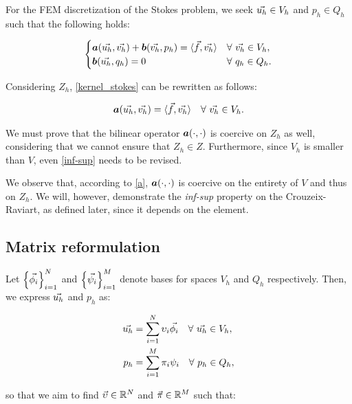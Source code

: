 For the FEM discretization of the Stokes problem, we seek $\vec{u_h} \in V_h$ and $p_h \in Q_h$ such that the following holds:

\begin{gather} \label{fem_stokes}
    \begin{cases}
        \bm{a}(\vec{u_h}, \vec{v_h}) + \bm{b}(\vec{v_h}, p_h) = \langle \vec{f}, \vec{v_h} \rangle & \forall ~ \vec{v_h} \in V_h, \\
        \bm{b}(\vec{u_h}, q_h) = 0 & \forall ~ q_h \in Q_h.
    \end{cases}
\end{gather}

Considering $Z_h$, \eqref{kernel_stokes} can be rewritten as follows:

\begin{gather} \label{fem_kernel}
    \bm{a}(\vec{u_h}, \vec{v_h}) = \langle \vec{f}, \vec{v_h} \rangle \quad \forall ~ \vec{v_h} \in V_h.
\end{gather}

We must prove that the bilinear operator $\bm{a}(\cdot, \cdot)$ is coercive on $Z_h$ as well, considering that we cannot ensure that $Z_h \in Z$. Furthermore, since $V_h$ is smaller than $V$, even \eqref{inf-sup} needs to be revised. 

We observe that, according to \eqref{a}, $\bm{a}(\cdot, \cdot)$ is coercive on the entirety of $V$ and thus on $Z_h$. We will, however, demonstrate the \textit{inf-sup} property on the Crouzeix-Raviart, as defined later, since it depends on the element.

\subsection{Matrix reformulation}

Let $\left\{ \vec{\phi_i} \right\}_{i = 1}^N$ and $\left\{ \vec{\psi_i} \right\}_{i = 1}^M$ denote bases for spaces $V_h$ and $Q_h$ respectively. Then, we express $\vec{u_h}$ and $p_h$ as:

\begin{align}
    \vec{u_h} &= \sum_{i = 1}^N \upsilon_i \vec{\phi_i} \quad \forall ~ \vec{u_h} \in V_h, \\
    p_h &= \sum_{i = 1}^M \pi_i \psi_i \quad \forall ~ p_h \in Q_h,
\end{align}

so that we aim to find $\vec{\upsilon} \in \mathbb{R}^N$ and $\vec{\pi} \in \mathbb{R}^M$ such that:

